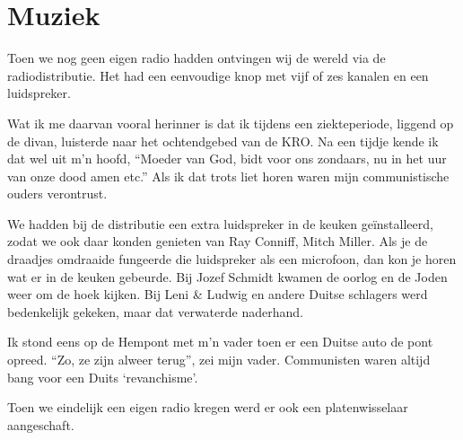 \documentclass[10pt,twoside, openright]{memoir}
\begin{document}
\chapter{Muziek} %
\label{cha:muziek}

Toen we nog geen eigen radio hadden ontvingen wij de wereld via de radiodistributie. Het had een eenvoudige knop met vijf of zes kanalen en een luidspreker. 

Wat ik me daarvan vooral herinner is dat ik tijdens een ziekteperiode, liggend op de divan, luisterde naar het ochtendgebed van de KRO. Na een tijdje kende ik dat wel uit m’n hoofd, ``Moeder van God, bidt voor ons zondaars, nu in het uur van onze dood amen etc.'' Als ik dat trots liet horen waren mijn communistische ouders verontrust. 

We hadden bij de distributie een extra luidspreker in de keuken geïnstalleerd, zodat we ook daar konden genieten van Ray Conniff, Mitch Miller. Als je de draadjes omdraaide fungeerde die luidspreker als een microfoon, dan kon je horen wat er in de keuken gebeurde. Bij Jozef Schmidt kwamen de oorlog en de Joden weer om de hoek kijken. Bij Leni \& Ludwig en andere Duitse schlagers werd bedenkelijk gekeken, maar dat verwaterde naderhand. 

Ik stond eens op de Hempont met m’n vader toen er een Duitse auto de pont opreed. ``Zo, ze zijn alweer terug'', zei mijn vader. Communisten waren altijd bang voor een Duits `revanchisme’.

Toen we eindelijk een eigen radio kregen werd er ook een platenwisselaar aangeschaft. 
\end{document}
